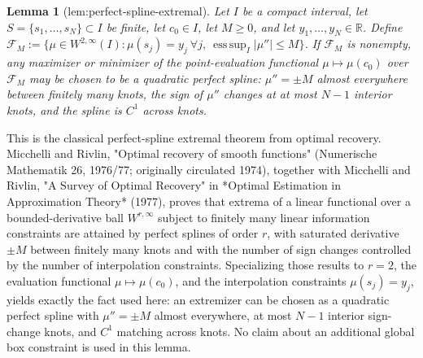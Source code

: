 \documentclass{article}
\newtheorem{lemma}{Lemma}
\begin{document}
\begin{lemma}[lem:perfect-spline-extremal]\label{lem:perfect-spline-extremal}
Let \(I\) be a compact interval, let \(S=\{s_1,\dots,s_N\}\subset I\) be finite, let \(c_0\in I\), let \(M\ge 0\), and let \(y_1,\dots,y_N\in \mathbb R\). Define \(\mathcal F_M:=\{\mu\in W^{2,\infty}(I): \mu(s_j)=y_j\ \forall j,\ \operatorname*{ess\,sup}_{I}|\mu''|\le M\}\). If \(\mathcal F_M\) is nonempty, any maximizer or minimizer of the point-evaluation functional \(\mu\mapsto \mu(c_0)\) over \(\mathcal F_M\) may be chosen to be a quadratic perfect spline: \(\mu''=\pm M\) almost everywhere between finitely many knots, the sign of \(\mu''\) changes at at most \(N-1\) interior knots, and the spline is \(C^1\) across knots.
\end{lemma}
This is the classical perfect-spline extremal theorem from optimal recovery. Micchelli and Rivlin, "Optimal recovery of smooth functions" (Numerische Mathematik 26, 1976/77; originally circulated 1974), together with Micchelli and Rivlin, "A Survey of Optimal Recovery" in *Optimal Estimation in Approximation Theory* (1977), proves that extrema of a linear functional over a bounded-derivative ball \(W^{r,\infty}\) subject to finitely many linear information constraints are attained by perfect splines of order \(r\), with saturated derivative \(\pm M\) between finitely many knots and with the number of sign changes controlled by the number of interpolation constraints. Specializing those results to \(r=2\), the evaluation functional \(\mu\mapsto\mu(c_0)\), and the interpolation constraints \(\mu(s_j)=y_j\), yields exactly the fact used here: an extremizer can be chosen as a quadratic perfect spline with \(\mu''=\pm M\) almost everywhere, at most \(N-1\) interior sign-change knots, and \(C^1\) matching across knots. No claim about an additional global box constraint is used in this lemma.
\end{document}
